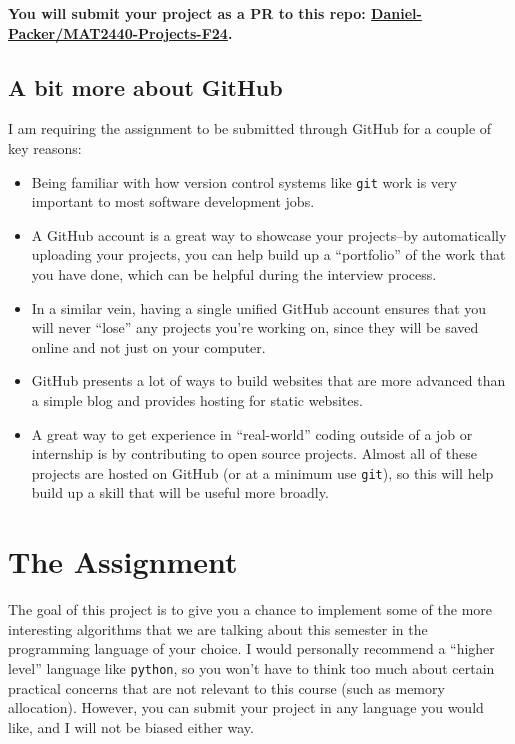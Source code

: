 \documentclass{article}
\begin{document}
\vspace{0.2in}
\centering \alert{
	\bf
	You will submit your project as a PR to this repo: \href{https://github.com/Daniel-Packer/MAT2440-Projects-F24}{Daniel-Packer/MAT2440-Projects-F24}.
}

\raggedright\subsection{A bit more about GitHub}
I am requiring the assignment to be submitted through GitHub for a couple of key reasons:
\begin{itemize}
	\item Being familiar with how version control systems like \texttt{git} work is very important to most software development jobs.
	\item A GitHub account is a great way to showcase your projects--by automatically uploading your projects, you can help build up a ``portfolio'' of the work that you have done, which can be helpful during the interview process.
	\item In a similar vein, having a single unified GitHub account ensures that you will never ``lose'' any projects you're working on, since they will be saved online and not just on your computer.
	\item GitHub presents a lot of ways to build websites that are more advanced than a simple blog and provides hosting for static websites.
	\item A great way to get experience in ``real-world'' coding outside of a job or internship is by contributing to open source projects. Almost all of these projects are hosted on GitHub (or at a minimum use \texttt{git}), so this will help build up a skill that will be useful more broadly.
\end{itemize}
\section{The Assignment}
The goal of this project is to give you a chance to implement some of the more interesting algorithms that we are talking about this semester in the programming language of your choice.
I would personally recommend a ``higher level'' language like \texttt{python}, so you won't have to think too much about certain practical concerns that are not relevant to this course (such as memory allocation).
However, you can submit your project in any language you would like, and I will not be biased either way.
\end{document}
